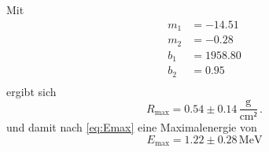 Mit
\begin{align*}
    m_1 &= -14.51   \\
    m_2 &= -0.28    \\
    b_1 &= 1958.80  \\
    b_2 &= 0.95     \\
\end{align*} ergibt sich
\begin{equation*}
    R_\text{max} = 0.54 \pm 0.14\, \dfrac{\unit{\gram}}{\unit{\cm²}} \,.
\end{equation*}
und damit nach \eqref{eq:Emax} eine Maximalenergie von
\begin{equation*}
    E_\text{max} = 1.22 \pm 0.28 \,\unit{\mega\eV}
\end{equation*}


